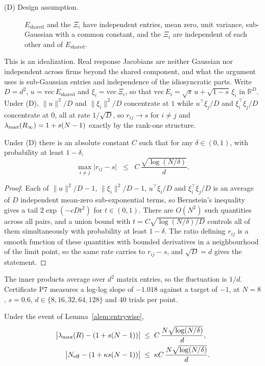 \begin{description}
\item[(D) Design assumption.] $E_{\text{shared}}$ and the $\Xi_i$ have independent entries, mean zero, unit variance, sub-Gaussian with a common constant, and the $\Xi_i$ are independent of each other and of $E_{\text{shared}}$.
\end{description}

This is an idealization. Real response Jacobians are neither Gaussian nor independent across firms beyond the shared component, and what the argument uses is sub-Gaussian entries and independence of the idiosyncratic parts. Write $D = d^2$, $u = \mathrm{vec}\,E_{\text{shared}}$ and $\xi_i = \mathrm{vec}\,\Xi_i$, so that $\mathrm{vec}\,E_i = \sqrt{s}\,u + \sqrt{1-s}\,\xi_i$ in $\mathbb{R}^D$. Under (D), $\|u\|^2/D$ and $\|\xi_i\|^2/D$ concentrate at $1$ while $u^{\top}\xi_j/D$ and $\xi_i^{\top}\xi_j/D$ concentrate at $0$, all at rate $1/\sqrt{D}$, so $r_{ij}\to s$ for $i\neq j$ and $\lambda_{\max}(R_\infty) = 1 + s(N-1)$ exactly by the rank-one structure.

\begin{alemma}
\label{alem:entrywise}
Under (D) there is an absolute constant $C$ such that for any $\delta \in (0,1)$, with probability at least $1-\delta$,
\[
  \max_{i \neq j} \big| r_{ij} - s \big| \;\;\leq\;\; C\,\frac{\sqrt{\log(N/\delta)}}{d}.
\]
\end{alemma}

\begin{proof}
Each of $\|u\|^2/D - 1$, $\|\xi_i\|^2/D - 1$, $u^{\top}\xi_i/D$ and $\xi_i^{\top}\xi_j/D$ is an average of $D$ independent mean-zero sub-exponential terms, so Bernstein's inequality gives a tail $2\exp(-cDt^2)$ for $t \in (0,1)$. There are $O(N^2)$ such quantities across all pairs, and a union bound with $t = C\sqrt{\log(N/\delta)/D}$ controls all of them simultaneously with probability at least $1-\delta$. The ratio defining $r_{ij}$ is a smooth function of these quantities with bounded derivatives in a neighbourhood of the limit point, so the same rate carries to $r_{ij}-s$, and $\sqrt{D}=d$ gives the statement.
\end{proof}

The inner products average over $d^2$ matrix entries, so the fluctuation is $1/d$. Certificate P7 measures a log-log slope of $-1.018$ against a target of $-1$, at $N=8$, $s=0.6$, $d \in \{8,16,32,64,128\}$ and 40 trials per point.

\begin{aproposition}
\label{aprop:weyl}
Under the event of Lemma~\ref{alem:entrywise},
\begin{align*}
  \big|\lambda_{\max}(R) - (1+s(N-1))\big| &\;\leq\; C\,\frac{N\sqrt{\log(N/\delta)}}{d}, \\
  \big|N_{\mathrm{eff}} - (1+\kappa s(N-1))\big| &\;\leq\; \kappa C\,\frac{N\sqrt{\log(N/\delta)}}{d}.
\end{align*}
\end{aproposition}

